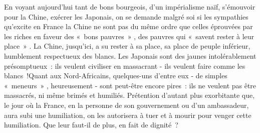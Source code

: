 \documentclass[french,twoside]{book} %
\begin{document}
En voyant aujourd'hui tant de bons bourgeois, d'un impérialisme naïf, s'émouvoir pour la Chine, exécrer les Japonais, on se demande malgré soi si les sympathies qu'excite en France la Chine ne sont pas du même ordre que celles éprouvées par les riches en faveur des « bons pauvres » , des pauvres qui « savent rester à leur place » . La Chine, jusqu'ici, a su rester à sa place, sa place de peuple inférieur, humblement respectueux des blancs. Les Japonais sont des jaunes intolérablement présomptueux : ils veulent civiliser en massacrant - ils veulent faire comme les blancs !Quant aux Nord-Africains, quelques-uns d'entre eux - de simples « meneurs » , heureusement - sont peut-être encore pires : ils ne veulent pas être massacrés, ni même brimés et humiliés. Prétention d'autant plus exorbitante que, le jour où la France, en la personne de son gouvernement ou d'un ambassadeur, aura subi une humilia­tion, on les autorisera à tuer et à mourir pour venger cette humiliation. Que leur faut-il de plus, en fait de dignité ?\par
\par
\end{document}
